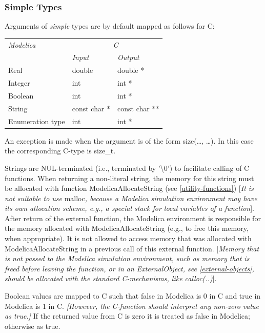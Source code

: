 \documentclass[10pt,a4paper]{report}
\def\doublelabel#1{\label{#1}\hypertarget{#1}{}}
\begin{document}
\subsubsection{Simple Types}\doublelabel{simple-types}

Arguments of \emph{simple} types are by default mapped as follows for C:

\begin{longtable}[]{|l|l|l|}
\hline
\emph{Modelica} & \multicolumn{2}{c|}{\emph{C}}\\ 
& \emph{Input} & \emph{Output}\\ \hline
\endhead
Real & double & double *\\ \hline
Integer & int & int *\\ \hline
Boolean & int & int *\\ \hline
String & const char * & const char **\\ \hline
Enumeration type & int & int *\\ \hline
\end{longtable}

An exception is made when the argument is of the form size(\ldots{},
\ldots{}). In this case the corresponding C-type is size\_t.

Strings are NUL-terminated (i.e., terminated by '\textbackslash{}0') to
facilitate calling of C functions. When returning a non-literal string,
the memory for this string must be allocated with function
ModelicaAllocateString (see \ref{utility-functions}) {[}\emph{It is not suitable
to use} malloc\emph{, because a Modelica simulation environment may have
its own allocation scheme, e.g., a special stack for local variables of
a function}{]}. After return of the external function, the Modelica
environment is responsible for the memory allocated with
ModelicaAllocateString (e.g., to free this memory, when appropriate). It
is not allowed to access memory that was allocated with
ModelicaAllocateString in a previous call of this external function.
{[}\emph{Memory that is not passed to the Modelica simulation
environment, such as memory that is freed before leaving the function,
or in an ExternalObject, see \ref{external-objects}, should be allocated
with the standard C-mechanisms, like calloc(..)}{]}.

Boolean values are mapped to C such that false in Modelica is 0 in C and
true in Modelica is 1 in C. \emph{{[}However, the C-function should
interpret any non-zero value as true.{]}} If the returned value from C
is zero it is treated as false in Modelica; otherwise as true.
\end{document}
